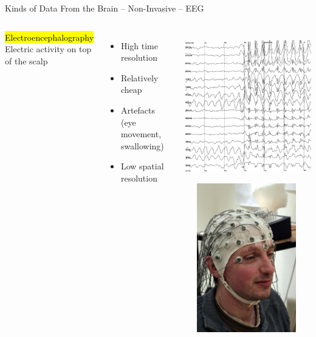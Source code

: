 \documentclass[handout,aspectratio=169]{beamer}
\begin{document}
\begin{frame}{Kinds of Data From the Brain -- Non-Invasive -- EEG}
	\vspace{0.25cm}
	\begin{columns}
		\hl{Electroencephalography}\\[0.125cm] Electric activity on top of the scalp\\[0.25cm]
		\begin{itemize}
			\setlength\itemsep{0.25cm}
			\item[\OPlus] High time resolution
			\item[\OMeh] Relatively cheap
			\item[\OMeh] Artefacts\\(eye movement, swallowing)
			\item[\OMinus] Low spatial resolution
		\end{itemize}
		\includegraphics[height=6.5cm,trim=0 0 3cm 0,clip]{media/eeg_electroencephalogram.png}~~%
		\includegraphics[height=6.5cm]{media/eeg_recording_cap_small.jpg}%
	\end{columns}
	\vspace{0.5cm}
\end{frame}
\end{document}
